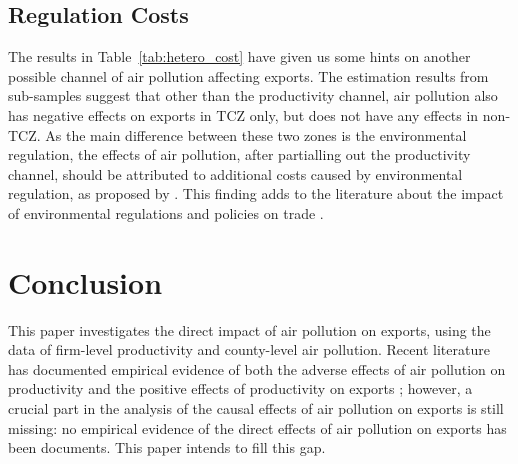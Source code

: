 \documentclass[12pt]{article}
\begin{document}
\subsection{Regulation Costs} \label{sec:6.2}
The results in Table~\ref{tab:hetero_cost} have given us some hints on another possible channel of air pollution affecting exports. The estimation results from sub-samples suggest that other than the productivity channel, air pollution also has negative effects on exports in TCZ only, but does not have any effects in non-TCZ. As the main difference between these two zones is the environmental regulation, the effects of air pollution, after partialling out the productivity channel, should be attributed to additional costs caused by environmental regulation, as proposed by \citep{cherniwchan2022environmental}. This finding adds to the literature about the impact of environmental regulations and policies on trade \citep{hering2014environmental,shi2018environmental,cherniwchan2022environmental,berman2001environmental,greenstone2012effects}. 


\section{Conclusion} \label{sec:7}
This paper investigates the direct impact of air pollution on exports, using the data of firm-level productivity and county-level air pollution. Recent literature has documented empirical evidence of both the adverse effects of air pollution on productivity \citep{greenstone2012effects,fu2021air,khanna2021productivity} and the positive effects of productivity on exports \citep{Kunst1989,Khandelwal2013}; however, a crucial part in the analysis of the causal effects of air pollution on exports is still missing: no empirical evidence of the direct effects of air pollution on exports has been documents. This paper intends to fill this gap. 
\end{document}

